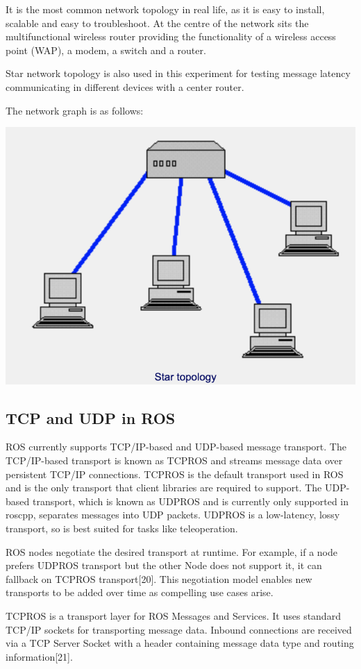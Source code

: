 \documentclass{mproj}
\begin{document}
It is the most common network topology in real life, as it is easy to install, scalable and easy to troubleshoot. At the centre of the network sits the multifunctional wireless router providing the functionality of a wireless access point (WAP), a modem, a switch and a router.

Star network topology is also used in this experiment for testing message latency communicating in different devices with a center router.

The network graph is as follows:

\includegraphics[width = .7\textwidth]{231.png}


\subsection{TCP and UDP in ROS}

ROS currently supports TCP/IP-based and UDP-based message transport. The TCP/IP-based transport is known as TCPROS and streams message data over persistent TCP/IP connections. TCPROS is the default transport used in ROS and is the only transport that client libraries are required to support. The UDP-based transport, which is known as UDPROS and is currently only supported in roscpp, separates messages into UDP packets. UDPROS is a low-latency, lossy transport, so is best suited for tasks like teleoperation.

ROS nodes negotiate the desired transport at runtime. For example, if a node prefers UDPROS transport but the other Node does not support it, it can fallback on TCPROS transport[20]. This negotiation model enables new transports to be added over time as compelling use cases arise.

TCPROS is a transport layer for ROS Messages and Services. It uses standard TCP/IP sockets for transporting message data. Inbound connections are received via a TCP Server Socket with a header containing message data type and routing information[21]. 
\end{document}
